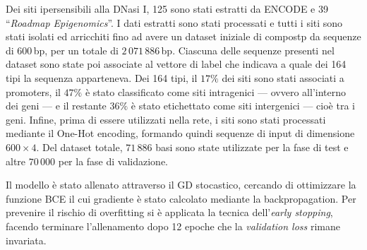 Dei siti ipersensibili alla DNasi I, 125 sono stati estratti da \acs{ENCODE} e 39 ``\textit{Roadmap Epigenomics}''. I dati estratti sono stati processati e tutti i siti sono stati isolati ed arricchiti fino ad avere un dataset iniziale di compostp da sequenze di 600\,bp, per un totale di $2\,071\,886$\,bp. Ciascuna delle sequenze presenti nel dataset sono state poi associate al vettore di label che indicava a quale dei 164 tipi la sequenza apparteneva. Dei 164 tipi, il $17\%$ dei siti sono stati associati a promoters, il $47\%$ è stato classificato come siti intragenici — ovvero all'interno dei geni — e il restante $36\%$ è stato etichettato come siti intergenici — cioè tra i geni. Infine, prima di essere utilizzati nella rete, i siti sono stati processati mediante il One-Hot encoding, formando quindi sequenze di input di dimensione $600\times 4$. Del dataset totale, $71\,886$ basi sono state utilizzate per la fase di test e altre $70\,000$ per la fase di validazione.

Il modello è stato allenato attraverso il \acs{GD} stocastico, cercando di ottimizzare la funzione \acs{BCE} il cui gradiente è stato calcolato mediante la backpropagation. Per prevenire il rischio di overfitting si è applicata la tecnica dell'\textit{early stopping}, facendo terminare l'allenamento dopo 12 epoche che la \textit{validation loss} rimane invariata. %

